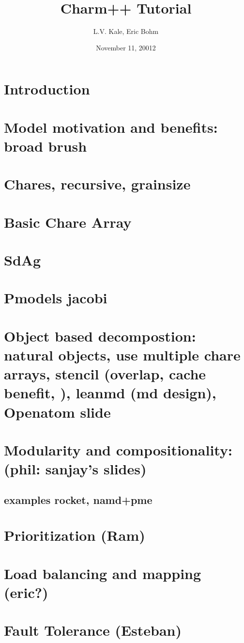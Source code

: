 \documentclass{beamer}
\title{Charm++ Tutorial}
\author{L.V. Kale, Eric Bohm}
\date{November 11, 20012}
\institute[2012]{Parallel Programming Lab, UIUC}
\begin{document}
\frame{\titlepage}

\section[Outline]{}
\frame{\tableofcontents}
\section{Introduction}
\section{Model motivation and benefits: broad brush}
\section{Chares, recursive, grainsize}
\section{Basic Chare Array}
\section{SdAg}
\section{Pmodels jacobi}
\section{Object based decompostion: natural objects, use multiple chare arrays, stencil (overlap, cache benefit, ), leanmd (md design), Openatom slide}
\section{Modularity and compositionality: (phil: sanjay’s slides)}
\subsection{examples rocket, namd+pme}
\section{Prioritization (Ram)}
\section{Load balancing and mapping (eric?)}
\section{Fault Tolerance (Esteban)}
\end{document}
